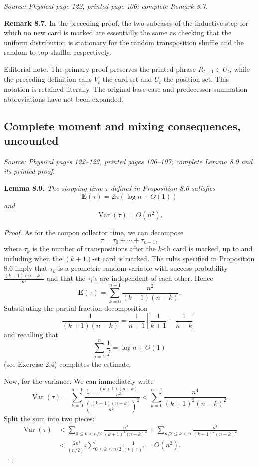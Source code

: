 \documentclass[11pt]{article}
\newcommand{\sourceloc}[1]{\par\smallskip\noindent\textit{Source: #1.}\par\nopagebreak[4]\smallskip}
\newcommand{\editorial}[1]{\par\smallskip\noindent\textsf{Editorial note.} #1\par\smallskip}
\begin{document}
\sourceloc{Physical page 122, printed page 106; complete Remark 8.7}
\noindent\textbf{Remark 8.7.}
In the preceding proof, the two subcases of the inductive step for
which no new card is marked are essentially the same as checking that
the uniform distribution is stationary for the random transposition
shuffle and the random-to-top shuffle, respectively.

\editorial{The primary proof preserves the printed phrase
$R_{t+1}\in U_t$, while the preceding definition calls $V_t$ the card
set and $U_t$ the position set. This notation is retained literally.
The original base-case and predecessor-summation abbreviations have
not been expanded.}

\subsection*{Complete moment and mixing consequences, uncounted}
\sourceloc{Physical pages 122--123, printed pages 106--107; complete Lemma 8.9 and its printed proof}
\noindent\textbf{Lemma 8.9.}
\emph{The stopping time $\tau$ defined in Proposition 8.6 satisfies}
\[
\mathbf{E}(\tau)=2n(\log n+O(1))
\]
\emph{and}
\[
\operatorname{Var}(\tau)=O(n^2).
\]
\begin{proof}
As for the coupon collector time, we can decompose
\[
\tau=\tau_0+\cdots+\tau_{n-1},
\]
where $\tau_k$ is the number of transpositions after the $k$-th card
is marked, up to and including when the $(k+1)$-st card is marked.
The rules specified in Proposition 8.6 imply that $\tau_k$ is a
geometric random variable with success probability
$\frac{(k+1)(n-k)}{n^2}$ and that the $\tau_i$'s are independent of
each other. Hence
\[
\mathbf{E}(\tau)=\sum_{k=0}^{n-1}\frac{n^2}{(k+1)(n-k)}.
\]
Substituting the partial fraction decomposition
\[
\frac{1}{(k+1)(n-k)}
=\frac{1}{n+1}\left[\frac{1}{k+1}+\frac{1}{n-k}\right]
\]
and recalling that
\[
\sum_{j=1}^n\frac1j=\log n+O(1)
\]
(see Exercise 2.4) completes the estimate.

Now, for the variance. We can immediately write
\[
\operatorname{Var}(\tau)
=\sum_{k=0}^{n-1}
\frac{1-\frac{(k+1)(n-k)}{n^2}}
{\left(\frac{(k+1)(n-k)}{n^2}\right)^2}
<\sum_{k=0}^{n-1}\frac{n^4}{(k+1)^2(n-k)^2}.
\]
Split the sum into two pieces:
\begin{align*}
\operatorname{Var}(\tau)
&<\sum_{0\le k<n/2}\frac{n^4}{(k+1)^2(n-k)^2}
 +\sum_{n/2\le k<n}\frac{n^4}{(k+1)^2(n-k)^2}\\
&<\frac{2n^4}{(n/2)^2}
\sum_{0\le k\le n/2}\frac{1}{(k+1)^2}=O(n^2).
\end{align*}
\end{proof}
\end{document}
